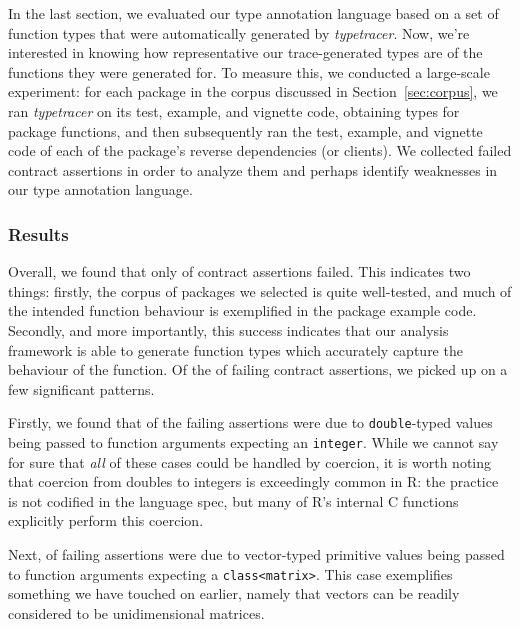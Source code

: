 \documentclass[acmsmall,review,anonymous]{acmart}\settopmatter{printfolios=true,printccs=false,printacmref=false}
\newcommand{\code}[1]{{\lstinline[style=Rin]!#1!}\xspace}
\newcommand{\typetracer}{\emph{typetracer}\xspace} %
\begin{document}

In the last section, we evaluated our type annotation language based on a set of function types that were automatically generated by \typetracer.
Now, we're interested in knowing how representative our trace-generated types are of the functions they were generated for.
To measure this, we conducted a large-scale experiment: for each package in the corpus discussed in Section~\ref{sec:corpus}, we ran \typetracer on its test, example, and vignette code, obtaining types for package functions, and then subsequently ran the test, example, and vignette code of each of the package's reverse dependencies (or clients).
We collected failed contract assertions in order to analyze them and perhaps identify weaknesses in our type annotation language.

%
%
\subsubsection{Results}


Overall, we found that only  of contract assertions failed.
This indicates two things: firstly, the corpus of packages we selected is quite well-tested, and much of the intended function behaviour is exemplified in the package example code. 
Secondly, and more importantly, this success indicates that our analysis framework is able to generate function types which accurately capture the behaviour of the function. 
Of the  of failing contract assertions, we picked up on a few significant patterns.

Firstly, we found that  of the failing assertions were due to \code{double}-typed values being passed to function arguments expecting an \code{integer}.
While we cannot say for sure that {\it all} of these cases could be handled by coercion, it is worth noting that coercion from doubles to integers is exceedingly common in R: the practice is not codified in the language spec, but many of R's internal C functions explicitly perform this coercion.

Next,  of failing assertions were due to vector-typed primitive values being passed to function arguments expecting a \code{class<matrix>}.
This case exemplifies something we have touched on earlier, namely that vectors can be readily considered to be unidimensional matrices.
\end{document}
